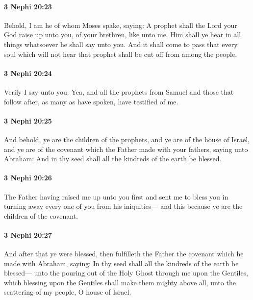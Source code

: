 		\paragraph{3 Nephi 20:23} %
			\label{3NEPHI-20-23}

			Behold, I am he of whom Moses spake, saying:
			A prophet shall the Lord your God raise up
			unto you, of your brethren, like unto me.
			Him shall ye hear in all things whatsoever he shall say unto you.
			And it shall come to pass that every soul which will not hear that prophet
			shall be cut off from among the people.

		\paragraph{3 Nephi 20:24} %
			\label{3NEPHI-20-24}

			Verily I say unto you:
			Yea, and all the prophets from Samuel and those that follow after,
			as many as have spoken, have testified of me.

		\paragraph{3 Nephi 20:25} %
			\label{3NEPHI-20-25}

			And behold, ye are the children of the prophets,
			and ye are of the house of Israel,
			and ye are of the covenant which the Father made with your fathers,
			saying unto Abraham:
			And in thy seed shall all the kindreds of the earth be blessed.

		\paragraph{3 Nephi 20:26} %
			\label{3NEPHI-20-26}

			The Father having raised me up unto you first
			and sent me to bless you
			in turning away every one of you from his iniquities---
			and this because ye are the children of the covenant.

		\paragraph{3 Nephi 20:27} %
			\label{3NEPHI-20-27}

			And after that ye were blessed,
			then fulfilleth the Father the covenant
			which he made with Abraham, saying:
			In thy seed shall all the kindreds of the earth be blessed---
			unto the pouring out of the Holy Ghost through me upon the Gentiles,
			which blessing upon the Gentiles shall make them mighty above all,
			unto the scattering of my people, O house of Israel.

